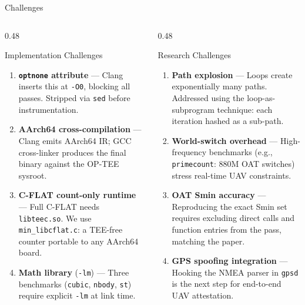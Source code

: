 \documentclass[aspectratio=169, 10pt]{beamer}
\begin{document}
\begin{frame}{Challenges}
    \begin{columns}[T]
        \begin{column}{0.48\textwidth}
            \begin{warnbox}{Implementation Challenges}
                \begin{enumerate}\scriptsize
                    \item \textbf{\texttt{optnone} attribute} --- Clang inserts
                          this at \texttt{-O0}, blocking all passes.
                          Stripped via \texttt{sed} before instrumentation.
                    \item \textbf{AArch64 cross-compilation} --- Clang emits
                          AArch64 IR; GCC cross-linker produces the final
                          binary against the OP-TEE sysroot.
                    \item \textbf{C-FLAT count-only runtime} --- Full C-FLAT
                          needs \texttt{libteec.so}. We use
                          \texttt{min\_libcflat.c}: a TEE-free counter
                          portable to any AArch64 board.
                    \item \textbf{Math library} (\texttt{-lm}) --- Three
                          benchmarks (\texttt{cubic}, \texttt{nbody},
                          \texttt{st}) require explicit \texttt{-lm} at
                          link time.
                \end{enumerate}
            \end{warnbox}
        \end{column}
        \begin{column}{0.48\textwidth}
            \begin{warnbox}{Research Challenges}
                \begin{enumerate}\scriptsize
                    \item \textbf{Path explosion} --- Loops create exponentially
                          many paths. Addressed using the loop-as-subprogram
                          technique: each iteration hashed as a sub-path.
                    \item \textbf{World-switch overhead} --- High-frequency
                          benchmarks (e.g., \texttt{primecount}: 880M OAT
                          switches) stress real-time UAV constraints.
                    \item \textbf{OAT Smin accuracy} --- Reproducing the exact
                          Smin set requires excluding direct calls and
                          function entries from the pass, matching the paper.
                    \item \textbf{GPS spoofing integration} --- Hooking the
                          NMEA parser in \texttt{gpsd} is the next step for
                          end-to-end UAV attestation.
                \end{enumerate}
            \end{warnbox}
        \end{column}
    \end{columns}
\end{frame}
\end{document}
